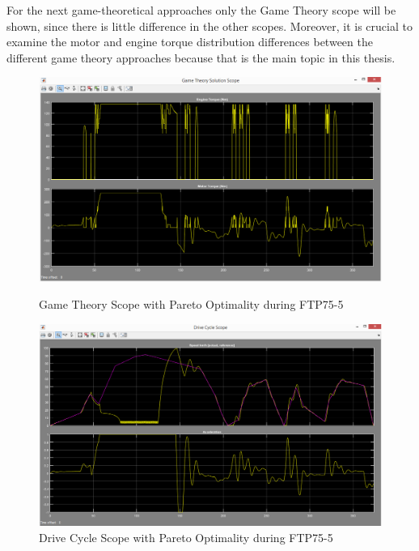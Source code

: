 For the next game-theoretical approaches only the Game Theory scope will be shown, since there is little difference in the other scopes. Moreover, it is crucial to examine the motor and engine torque distribution differences between the different game theory approaches because that is the main topic in this thesis.

\begin{figure}[hp]
\centering
\includegraphics[scale=0.45]{figures/Pareto/FTP75-5/gameTheory05Juli}
\caption{Game Theory Scope with Pareto Optimality during FTP75-5}
\label{fig:gtpo5}
\includegraphics[scale=0.41]{figures/Pareto/FTP75-5/driveCycle05Juli}
\caption{Drive Cycle Scope with Pareto Optimality during FTP75-5}
\label{fig:dcpo5}
\end{figure}

